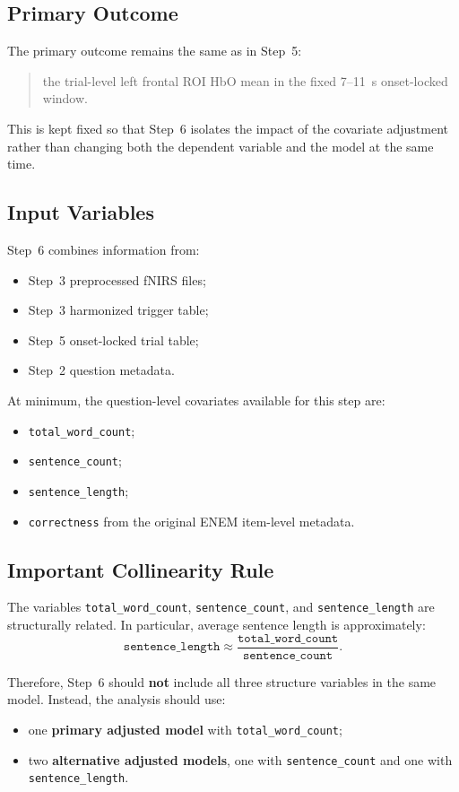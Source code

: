 \documentclass[11pt]{article}
\begin{document}
\subsection{Primary Outcome}
The primary outcome remains the same as in Step~5:
\begin{quote}
the trial-level left frontal ROI HbO mean in the fixed 7--11~s onset-locked window.
\end{quote}

This is kept fixed so that Step~6 isolates the impact of the covariate adjustment rather than
changing both the dependent variable and the model at the same time.

\subsection{Input Variables}
Step~6 combines information from:
\begin{itemize}
    \item Step~3 preprocessed fNIRS files;
    \item Step~3 harmonized trigger table;
    \item Step~5 onset-locked trial table;
    \item Step~2 question metadata.
\end{itemize}

At minimum, the question-level covariates available for this step are:
\begin{itemize}
    \item \texttt{total\_word\_count};
    \item \texttt{sentence\_count};
    \item \texttt{sentence\_length};
    \item \texttt{correctness} from the original ENEM item-level metadata.
\end{itemize}

\subsection{Important Collinearity Rule}
The variables \texttt{total\_word\_count}, \texttt{sentence\_count}, and \texttt{sentence\_length}
are structurally related.
In particular, average sentence length is approximately:
\begin{equation}
\texttt{sentence\_length}
\approx
\frac{\texttt{total\_word\_count}}{\texttt{sentence\_count}}.
\end{equation}

Therefore, Step~6 should \textbf{not} include all three structure variables in the same model.
Instead, the analysis should use:
\begin{itemize}
    \item one \textbf{primary adjusted model} with \texttt{total\_word\_count};
    \item two \textbf{alternative adjusted models}, one with \texttt{sentence\_count} and one with
    \texttt{sentence\_length}.
\end{itemize}
\end{document}
